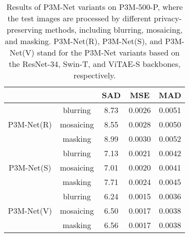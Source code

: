 \documentclass[twocolumn]{svjour3}
\begin{document}
\begin{table*}[htb]
\begin{center}
\end{center}
\caption{Ablation study of the key modules in P3M-Net. The BASIC version stands for the bare multi-task framework without any addition modules.}
\label{tab:ablation}
\end{table*}


\begin{table}[htb]
\begin{center}
\begin{tabular}{c|c|ccc}
\hline
& & SAD & MSE & MAD \\
\hline
& blurring & 8.73 & 0.0026 & 0.0051 \\
P3M-Net(R) & mosaicing &8.55 & 0.0028 & 0.0050 \\
& masking &8.99 & 0.0030 & 0.0052 \\
\hline
& blurring & 7.13 & 0.0021 & 0.0042 \\
P3M-Net(S) & mosaicing & 7.01 & 0.0020 & 0.0041 \\
& masking & 7.71 & 0.0024 & 0.0045 \\
\hline
& blurring & 6.24 & 0.0015 & 0.0036 \\
P3M-Net(V) & mosaicing & 6.50 & 0.0017 & 0.0038 \\
& masking & 6.56 & 0.0017 & 0.0038 \\
\hline
\end{tabular}
\end{center}
\caption{Results of P3M-Net variants on P3M-500-P, where the test images are processed by different privacy-preserving methods, including blurring, mosaicing, and masking. P3M-Net(R), P3M-Net(S), and P3M-Net(V) stand for the P3M-Net variants based on the ResNet-34, Swin-T, and ViTAE-S backbones, respectively.}
\label{tab:experiment-p3m-different-obfuscation}
\end{table}
\end{document}
